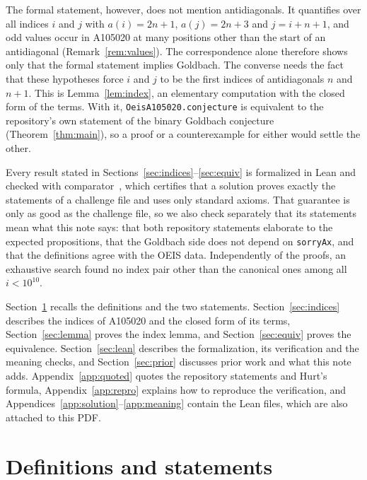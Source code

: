 \documentclass[11pt,a4paper]{article}
\newcommand{\li}{\lstinline[style=inline]}
\theoremstyle{plain}
\theoremstyle{remark}
\begin{document}
The formal statement, however, does not mention antidiagonals. It quantifies over all
indices $i$ and $j$ with $a(i) = 2n+1$, $a(j) = 2n+3$ and $j = i+n+1$, and odd values
occur in A105020 at many positions other than the start of an antidiagonal
(Remark~\ref{rem:values}). The correspondence alone therefore shows only that the
formal statement implies Goldbach. The converse needs the fact that these hypotheses
force $i$ and $j$ to be the first indices of antidiagonals $n$ and $n+1$. This is
Lemma~\ref{lem:index}, an elementary computation with the closed form of the terms.
With it, \li{OeisA105020.conjecture} is equivalent to the repository's own statement of
the binary Goldbach conjecture (Theorem~\ref{thm:main}), so a proof or a
counterexample for either would settle the other.

Every result stated in Sections~\ref{sec:indices}--\ref{sec:equiv} is formalized in Lean
and checked with comparator~\cite{comparator}, which certifies that a solution proves
exactly the statements of a challenge file and uses only standard axioms. That
guarantee is only as good as the challenge file, so we also check separately that its
statements mean what this note says: that both repository statements elaborate to the
expected propositions, that the Goldbach side does not depend on \li{sorryAx}, and that
the definitions agree with the OEIS data. Independently of the proofs, an exhaustive
search found no index pair other than the canonical ones among all $i < 10^{10}$.

Section~\ref{sec:defs} recalls the definitions and the two statements.
Section~\ref{sec:indices} describes the indices of A105020 and the closed form of its
terms, Section~\ref{sec:lemma} proves the index lemma, and Section~\ref{sec:equiv}
proves the equivalence. Section~\ref{sec:lean} describes the formalization, its
verification and the meaning checks, and Section~\ref{sec:prior} discusses prior work
and what this note adds. Appendix~\ref{app:quoted} quotes the repository statements
and Hurt's formula, Appendix~\ref{app:repro} explains how to reproduce the
verification, and Appendices~\ref{app:solution}--\ref{app:meaning} contain the Lean
files, which are also attached to this PDF.

\section{Definitions and statements}\label{sec:defs}
\end{document}
